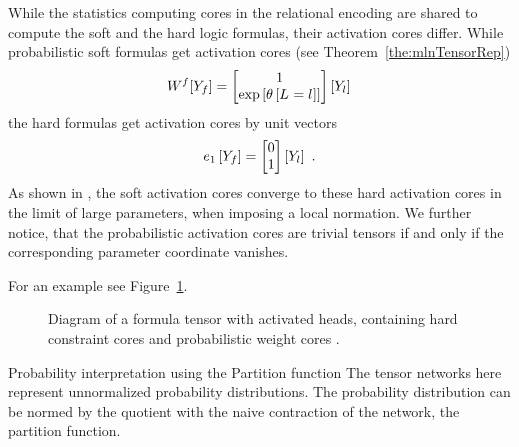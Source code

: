 While the statistics computing cores in the relational encoding are shared to compute the soft and the hard logic formulas, their activation cores differ.
While probabilistic soft formulas get activation cores (see Theorem~\ref{the:mlnTensorRep})
\begin{align*}
	W^{f}[Y_{f}] 
	= \begin{bmatrix} 1 \\
		 \mathrm{exp}\left[\theta\left[L_{}=l_{}\right]\right] 
		 \end{bmatrix}[Y_{l}] \,
\end{align*}
the hard formulas get activation cores by unit vectors
\begin{align*}
	\tbasisat{\formulavar} 
	= \begin{bmatrix} 0 \\
		 1
	 \end{bmatrix}[\enumformulavar]  \, .
\end{align*}
As shown in , the soft activation cores converge to these hard activation cores in the limit of large parameters, when imposing a local normation.
%
We further notice, that the probabilistic activation cores are trivial tensors if and only if the corresponding parameter coordinate vanishes.


For an example see Figure~\ref{fig:ActivatedHeads}.

\begin{figure}[h]
\begin{center}
	
\end{center}
\caption{Diagram of a formula tensor with activated heads, containing \textcolor{\concolor}{hard constraint cores} and \textcolor{\probcolor}{probabilistic weight cores} .} %
\label{fig:ActivatedHeads} 
\end{figure}



\begin{remark}{Probability interpretation using the Partition function}
	The tensor networks here represent unnormalized probability distributions.
	The probability distribution can be normed by the quotient with the naive contraction of the network, the partition function.
\end{remark}



